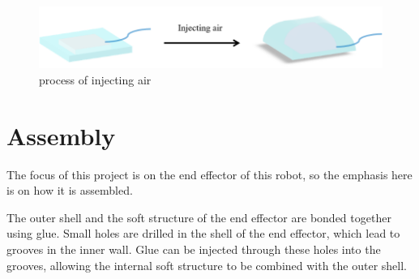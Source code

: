 \documentclass[10pt, a4paper, twocolumn]{article}
\begin{document}
\begin{figure}
    \centering
    \includegraphics[width=0.8\linewidth]{process of injecting air.png}
    \caption{process of injecting air}
    \label{fig:process of injecting air}
\end{figure}

\section{Assembly}
The focus of this project is on the end effector of this robot, so the emphasis here is on how it is assembled.

The outer shell and the soft structure of the end effector are bonded together using glue. Small holes are drilled in the shell of the end effector, which lead to grooves in the inner wall. Glue can be injected through these holes into the grooves, allowing the internal soft structure to be combined with the outer shell.



\end{document}
